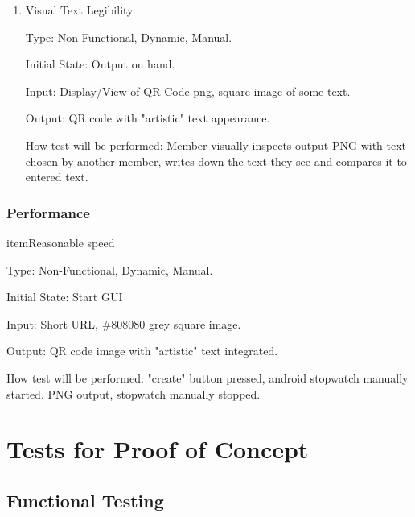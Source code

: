 \documentclass[12pt, titlepage]{article}
\begin{document}
\begin{enumerate}
\begin{enumerate}
\item{Visual Text Legibility\\}

Type: Non-Functional, Dynamic, Manual.
					
Initial State: Output on hand.
					
Input: Display/View of QR Code png, square image of some text.
					
Output: QR code with "artistic" text appearance.
					
How test will be performed: Member visually inspects output PNG with text chosen by another member, writes down the text they see and compares it to entered text.

\end{enumerate}

\subsubsection{Performance}

item{Reasonable speed\\}

Type: Non-Functional, Dynamic, Manual.
					
Initial State: Start GUI 
					
Input: Short URL, \#808080 grey square image.
					
Output: QR code image with "artistic" text integrated.
					
How test will be performed: "create" button pressed, android stopwatch manually started. PNG output, stopwatch manually stopped.

\end{enumerate}

\section{Tests for Proof of Concept}

\subsection{Functional Testing}
\end{document}
